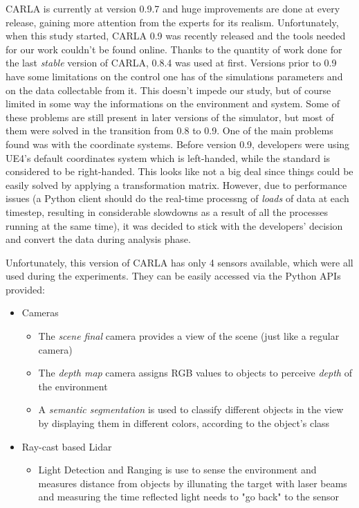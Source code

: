 CARLA is currently at version 0.9.7 and huge improvements are done at every release, gaining more attention from the experts for its realism. Unfortunately, when this study started, CARLA 0.9 was recently released and the tools needed for our work couldn't be found online. Thanks to the quantity of work done for the last \textit{stable} version of CARLA, 0.8.4 was used at first.\newline
Versions prior to 0.9 have some limitations on the control one has of the simulations parameters and on the data collectable from it. This doesn't impede our study, but of course limited in some way the informations on the environment and system. Some of these problems are still present in later versions of the simulator, but most of them were solved in the transition from 0.8 to 0.9.\newline\newline
One of the main problems found was with the coordinate systems. Before version 0.9, developers were using UE4's default coordinates system which is left-handed, while the standard is considered to be right-handed. This looks like not a big deal since things could be easily solved by applying a transformation matrix. However, due to performance issues (a Python client should do the real-time processng of \textsl{loads} of data at each timestep, resulting in considerable slowdowns as a result of all the processes running at the same time), it was decided to stick with the developers' decision and convert the data during analysis phase.

Unfortunately, this version of CARLA has only 4 sensors available, which were all used during the experiments. They can be easily accessed via the Python APIs provided:

\begin{itemize}
	\item Cameras
	\begin{itemize}
		\item The \textsl{scene final} camera provides a view of the scene (just like a regular camera)
		\item The \textsl{depth map} camera assigns RGB values to objects to perceive \textsl{depth} of the environment
		\item A \textsl{semantic segmentation} is used to classify different objects in the view by displaying them in different colors, according to the object's class
	\end{itemize}
	\item Ray-cast based Lidar
	\begin{itemize}
		\item Light Detection and Ranging is use to sense the environment and measures distance from objects by illunating the target with laser beams and measuring the time reflected light needs to "go back" to the sensor
	\end{itemize}
\end{itemize}

